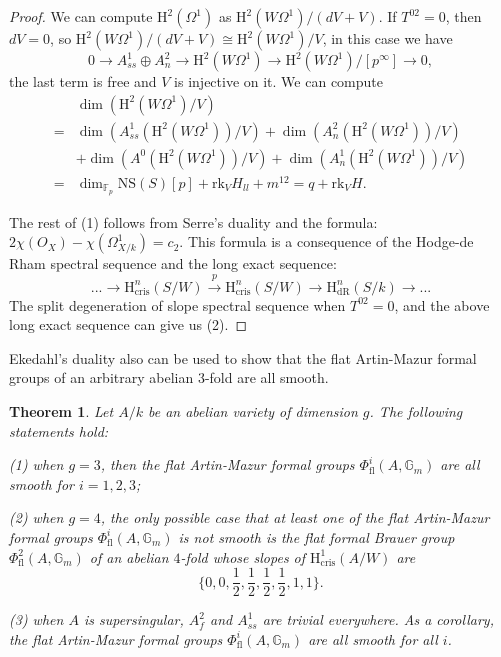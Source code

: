 \documentclass[a4paper,12pt,twoside]{report}
\newtheorem{theorem}{Theorem}[section]
\newcommand{\F}{\mathbb{F}}
\newcommand{\G}{\mathbb{G}}
\newcommand{\cris}{\mathrm{cris}}
\newcommand{\dR}{\mathrm{dR}}
\newcommand{\NS}{\mathrm{NS}}
\newcommand{\HH}{\mathrm{H}}
\newcommand{\fl}{\mathrm{fl}}
\newcommand{\rk}{\mathrm{rk}}
\begin{document}
\begin{proof}
We can compute $\HH^2(\Omega^1)$ as $\HH^2(W\Omega^1)/(dV+V)$. If $T^{02}=0$, then $dV=0$, 
so $\HH^2(W\Omega^1)/(dV+V)\cong \HH^2(W\Omega^1)/V$, in this case we have 
\[0\rightarrow A_{ss}^1\oplus A_n^2 \rightarrow \HH^2(W\Omega^1)\rightarrow \HH^2(W\Omega^1)/[p^\infty]\rightarrow 0,\]
the last term is free and $V$ is injective on it. 
We can compute \[\begin{aligned}
    &\dim(\HH^2(W\Omega^1)/V)\\
    =&\dim(A_{ss}^1(\HH^2(W\Omega^1))/V)+\dim(A_n^2(\HH^2(W\Omega^1))/V)\\
     &+\dim(A^0(\HH^2(W\Omega^1))/V)+\dim(A^1_n(\HH^2(W\Omega^1))/V)\\
    =&\dim_{\F_p}\NS(S)[p]+\rk _VH_{ll}+m^{12}=q+\rk_VH. 
\end{aligned}\]

The rest of (1) follows from Serre's duality and the formula: $2\chi(O_X)-\chi(\Omega^1_{X/k})=c_2$. 
This formula is a consequence of the Hodge-de Rham spectral sequence and the long exact sequence: 
\[...\rightarrow \HH^n_{\cris}(S/W)\xrightarrow{p}\HH^n_{\cris}(S/W) \rightarrow \HH^n_{\dR}(S/k)\rightarrow...\]
The split degeneration of slope spectral sequence when $T^{02}=0$, and the above long exact sequence can give us (2).
\end{proof}

Ekedahl's duality also can be used to show that the flat Artin-Mazur formal groups 
of an arbitrary abelian 3-fold are all smooth. 

\begin{theorem}\label{flatAMFsmooth}
    Let $A/k$ be an abelian variety of dimension $g$. The following statements hold: 

{\rm  (1)}    when $g=3$, then the flat Artin-Mazur formal groups 
    $\Phi^i_{\fl}(A,\G_m)$ are all smooth for $i=1,2,3$; 

{\rm  (2)}    when $g=4$, the only possible case that at least one of the flat Artin-Mazur formal groups 
$\Phi^i_{\fl}(A,\G_m)$ is not smooth is the flat formal Brauer group $\Phi^2_{\fl}(A,\G_m)$ of an abelian $4$-fold whose slopes of 
$\HH^1_{\cris}(A/W)$ are \[\{0,0,\frac{1}{2},\frac{1}{2},\frac{1}{2},\frac{1}{2},1,1\}.\] 

{\rm  (3)}    when $A$ is supersingular,  $A_f^2$ and $A_{ss}^1$ are trivial everywhere. 
As a corollary, the flat Artin-Mazur formal groups 
$\Phi^i_{\fl}(A,\G_m)$ are all smooth for all $i$.  
\end{theorem}
\end{document}
